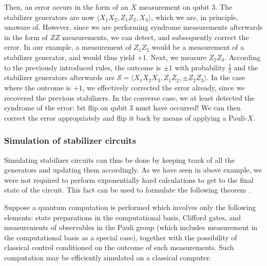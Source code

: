 Then, an error occurs in the form of an $X$ measurement on qubit 3. The
stabilizer generators are now $\langle X_1X_2, Z_1Z_2, X_3\rangle$, which we
are, in principle, unaware of. However,
since we are performing syndrome measurements afterwards in the form of $ZZ$
measurements, we can detect, and subsequently correct the error. In our
example, a measurement of $Z_1Z_2$ would be a measurement of a stabilizer
generator, and would thus yield $+1$. Next, we measure $Z_2Z_3$. According to
the previously introduced rules, the outcome is $\pm 1$ with probability
$\frac{1}{2}$ and the stabilizer generators afterwards are $\mathcal{S} =
\langle X_1X_2X_3, Z_1Z_2, \pm Z_2Z_3\rangle$. In the case where the outcome is
$+1$, we effectively corrected the error already, since we recovered the
previous stabilizers. In the converse case, we at least detected the syndrome
of the error: bit flip on qubit $3$ must have occurred! We can then correct the
error appropriately and flip it back by means of applying a Pauli-$X$.

\subsubsection{Simulation of stabilizer circuits}
Simulating stabilizer circuits can thus be done by keeping track of all the
generators and updating them accordingly. As we have seen in above example, we
were not required to perform exponentially hard calculations to get to the
final state of the circuit. This fact can be used to formulate the following
theorem \cite{gottesmanHeisenbergRepresentationQuantum1998}.
\begin{thm}\label{thm:gottesman-knill}
  Suppose a quantum computation is performed which involves only the following
  elements: state preparations in the computational basis, Clifford gates, and
  measurements of observables in the Pauli group (which includes measurement in
  the computational basis as a special case), together with the possibility of
  classical control conditioned on the outcome of such measurements. Such
  computation may be efficiently simulated on a classical computer.
\end{thm}

